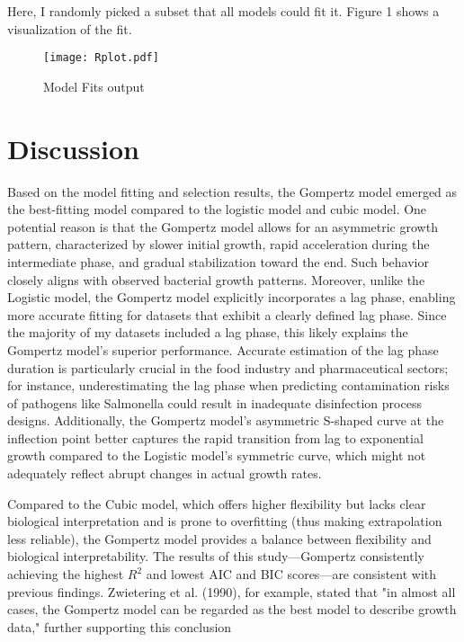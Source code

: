 \documentclass{article}
\begin{document}
Here, I randomly picked a subset that all models could fit it. Figure 1 shows a visualization of the fit.
\begin{figure}[h!]
  \centering
  \texttt{[image: Rplot.pdf]}
  \caption{Model Fits output}
  \label{fig:yourlabel}
\end{figure}


\section{Discussion}
Based on the model fitting and selection results, the Gompertz model emerged as the best-fitting model compared to the logistic model and cubic model. One potential reason is that the Gompertz model allows for an asymmetric growth pattern, characterized by slower initial growth, rapid acceleration during the intermediate phase, and gradual stabilization toward the end. Such behavior closely aligns with observed bacterial growth patterns. Moreover, unlike the Logistic model, the Gompertz model explicitly incorporates a lag phase, enabling more accurate fitting for datasets that exhibit a clearly defined lag phase. Since the majority of my datasets included a lag phase, this likely explains the Gompertz model’s superior performance. Accurate estimation of the lag phase duration is particularly crucial in the food industry and pharmaceutical sectors; for instance, underestimating the lag phase when predicting contamination risks of pathogens like Salmonella could result in inadequate disinfection process designs. \cite{juneja2007growth} Additionally, the Gompertz model's asymmetric S-shaped curve at the inflection point better captures the rapid transition from lag to exponential growth compared to the Logistic model’s symmetric curve, which might not adequately reflect abrupt changes in actual growth rates. \cite{baranyi1993logistic}

Compared to the Cubic model, which offers higher flexibility but lacks clear biological interpretation and is prone to overfitting (thus making extrapolation less reliable), the Gompertz model provides a balance between flexibility and biological interpretability. The results of this study—Gompertz consistently achieving the highest \( R^2 \) and lowest AIC and BIC scores—are consistent with previous findings. Zwietering et al. (1990), for example, stated that "in almost all cases, the Gompertz model can be regarded as the best model to describe growth data," further supporting this conclusion
\end{document}
